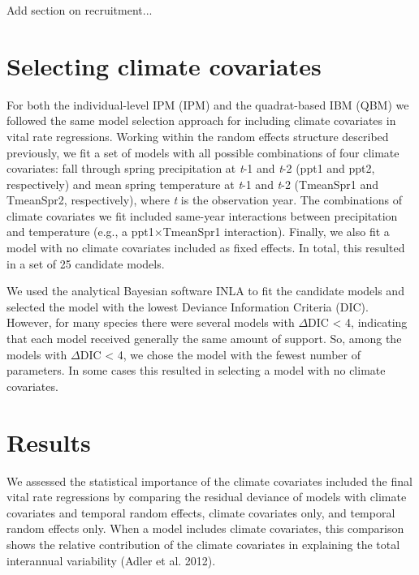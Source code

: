 \documentclass[12pt]{article}
\begin{document}
Add section on recruitment...

\section{Selecting climate covariates}
For both the individual-level IPM (IPM) and the quadrat-based IBM (QBM) we followed the same model selection approach for including climate covariates in vital rate regressions.  Working within the random effects structure described previously, we fit a set of models with all possible combinations of four climate covariates: fall through spring precipitation at \emph{t}-1 and \emph{t}-2 (ppt1 and ppt2, respectively) and mean spring temperature at \emph{t}-1 and \emph{t}-2 (TmeanSpr1 and TmeanSpr2, respectively), where \emph{t} is the observation year. The combinations of climate covariates we fit included same-year interactions between precipitation and temperature (e.g., a ppt1$\times$TmeanSpr1 interaction). Finally, we also fit a model with no climate covariates included as fixed effects. In total, this resulted in a set of 25 candidate models.

We used the analytical Bayesian software INLA to fit the candidate models and selected the model with the lowest Deviance Information Criteria (DIC). However, for many species there were several models with $\Delta$DIC < 4, indicating that each model received generally the same amount of support. So, among the models with $\Delta$DIC < 4, we chose the model with the fewest number of parameters. In some cases this resulted in selecting a model with no climate covariates.

\section{Results}
We assessed the statistical importance of the climate covariates included the final vital rate regressions by comparing the residual deviance of models with climate covariates and temporal random effects, climate covariates only, and temporal random effects only. When a model includes climate covariates, this comparison shows the relative contribution of the climate covariates in explaining the total interannual variability (Adler et al. 2012).
\end{document}
